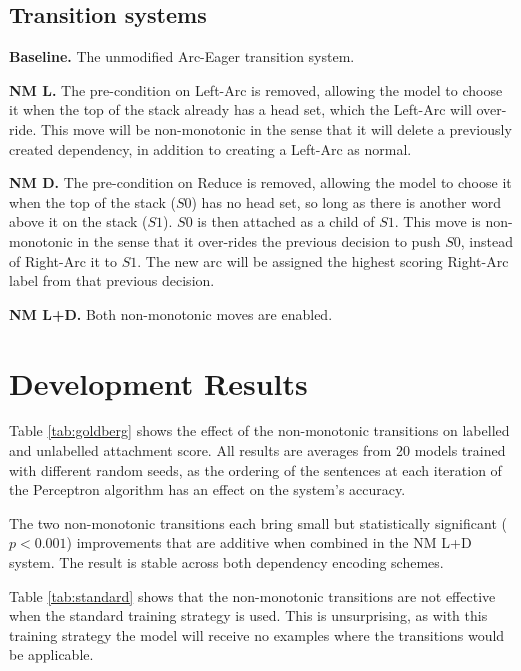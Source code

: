 \documentclass[11pt,letterpaper]{article}
\begin{document}
\subsection{Transition systems}

\textbf{Baseline.} The unmodified Arc-Eager transition system.

\textbf{NM L.} The pre-condition on Left-Arc is removed, allowing the model to
choose it when the top of the stack already has a head set, which the Left-Arc will
over-ride. This move will be non-monotonic in the
sense that it will delete a previously created dependency, in addition to creating
a Left-Arc as normal.

\textbf{NM D.} The pre-condition on Reduce is removed, allowing the model to choose it
when the top of the stack ($S0$) has no head set, so long as there is another word
above it on the stack ($S1$). $S0$ is then attached as a child of $S1$. This move
is non-monotonic in the sense that it over-rides the previous decision to push $S0$,
instead of Right-Arc it to $S1$. The new arc will be assigned the highest scoring
Right-Arc label from that previous decision.

\textbf{NM L+D.} Both non-monotonic moves are enabled. 

\section{Development Results}
\label{sec:results}

Table \ref{tab:goldberg} shows the effect of the non-monotonic transitions on
labelled and unlabelled attachment score. All results are averages from 20 models
trained with different random seeds, as the ordering of the sentences at each iteration
of the Perceptron algorithm has an effect on the system's accuracy.

The two non-monotonic transitions each bring small but statistically significant
($p < 0.001$) improvements that are additive when combined in the NM L+D system.
The result is stable across both dependency encoding schemes.

Table \ref{tab:standard} shows that the non-monotonic transitions are not effective
when the standard training strategy is used. This is unsurprising, as with this
training strategy the model will receive no examples where the transitions would
be applicable.
\end{document}
